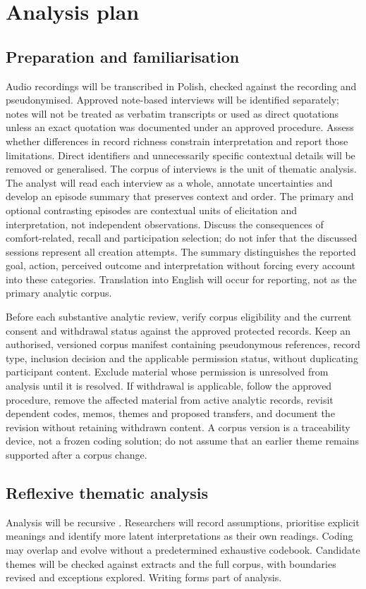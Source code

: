 \section{Analysis plan}
\subsection{Preparation and familiarisation}
Audio recordings will be transcribed in Polish, checked against the recording and pseudonymised. Approved note-based interviews will be identified separately; notes will not be treated as verbatim transcripts or used as direct quotations unless an exact quotation was documented under an approved procedure. Assess whether differences in record richness constrain interpretation and report those limitations. Direct identifiers and unnecessarily specific contextual details will be removed or generalised. The corpus of interviews is the unit of thematic analysis. The analyst will read each interview as a whole, annotate uncertainties and develop an episode summary that preserves context and order. The primary and optional contrasting episodes are contextual units of elicitation and interpretation, not independent observations. Discuss the consequences of comfort-related, recall and participation selection; do not infer that the discussed sessions represent all creation attempts. The summary distinguishes the reported goal, action, perceived outcome and interpretation without forcing every account into these categories. Translation into English will occur for reporting, not as the primary analytic corpus.

Before each substantive analytic review, verify corpus eligibility and the current consent and withdrawal status against the approved protected records. Keep an authorised, versioned corpus manifest containing pseudonymous references, record type, inclusion decision and the applicable permission status, without duplicating participant content. Exclude material whose permission is unresolved from analysis until it is resolved. If withdrawal is applicable, follow the approved procedure, remove the affected material from active analytic records, revisit dependent codes, memos, themes and proposed transfers, and document the revision without retaining withdrawn content. A corpus version is a traceability device, not a frozen coding solution; do not assume that an earlier theme remains supported after a corpus change.

\subsection{Reflexive thematic analysis}
Analysis will be recursive \citep{braun2021,byrne2022}. Researchers will record assumptions, prioritise explicit meanings and identify more latent interpretations as their own readings. Coding may overlap and evolve without a predetermined exhaustive codebook. Candidate themes will be checked against extracts and the full corpus, with boundaries revised and exceptions explored. Writing forms part of analysis.

